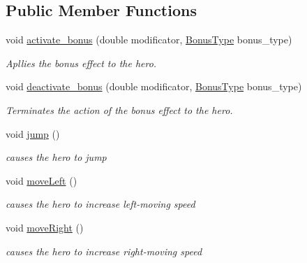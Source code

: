 \subsection*{Public Member Functions}
\begin{DoxyCompactItemize}
\item 
void \hyperlink{class_player_a18c12a3d320a15d87539cd6de2acca66}{activate\+\_\+bonus} (double modificator, \hyperlink{_bonus_8h_ad6d58ebabfbf9aa4181bfe97a5d8d984}{Bonus\+Type} bonus\+\_\+type)
\begin{DoxyCompactList}\small\item\em Apllies the bonus effect to the hero. \end{DoxyCompactList}\item 
void \hyperlink{class_player_a984c3a87de751efe818203bb01e8d5e9}{deactivate\+\_\+bonus} (double modificator, \hyperlink{_bonus_8h_ad6d58ebabfbf9aa4181bfe97a5d8d984}{Bonus\+Type} bonus\+\_\+type)
\begin{DoxyCompactList}\small\item\em Terminates the action of the bonus effect to the hero. \end{DoxyCompactList}\item 
\mbox{\label{class_player_a70e21ca98281b7d72f105f2693113d7e}} 
void \hyperlink{class_player_a70e21ca98281b7d72f105f2693113d7e}{jump} ()
\begin{DoxyCompactList}\small\item\em causes the hero to jump \end{DoxyCompactList}\item 
\mbox{\label{class_player_ae3bbcf1159bdc059bff1c2513f2505f7}} 
void \hyperlink{class_player_ae3bbcf1159bdc059bff1c2513f2505f7}{move\+Left} ()
\begin{DoxyCompactList}\small\item\em causes the hero to increase left-\/moving speed \end{DoxyCompactList}\item 
\mbox{\label{class_player_a6a2b68bc4b21d4c4a79a23b498896ec2}} 
void \hyperlink{class_player_a6a2b68bc4b21d4c4a79a23b498896ec2}{move\+Right} ()
\begin{DoxyCompactList}\small\item\em causes the hero to increase right-\/moving speed \end{DoxyCompactList}\item 

\end{DoxyCompactItemize}
